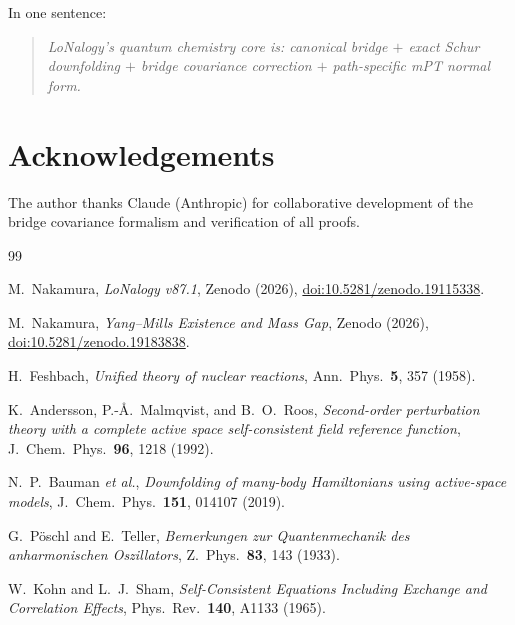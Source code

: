\documentclass[12pt]{article}
\theoremstyle{plain}
\theoremstyle{definition}
\numberwithin{equation}{section}
\begin{document}
In one sentence:
\begin{quote}
\emph{LoNalogy's quantum chemistry core is:
canonical bridge $+$ exact Schur downfolding $+$
bridge covariance correction $+$ path-specific mPT normal form.}
\end{quote}


\section*{Acknowledgements}

The author thanks Claude (Anthropic) for collaborative development
of the bridge covariance formalism and verification of all proofs.


\begin{thebibliography}{99}

M.~Nakamura,
\textit{LoNalogy v87.1},
Zenodo (2026),
\href{https://doi.org/10.5281/zenodo.19115338}{doi:10.5281/zenodo.19115338}.

M.~Nakamura,
\textit{Yang--Mills Existence and Mass Gap},
Zenodo (2026),
\href{https://doi.org/10.5281/zenodo.19183838}{doi:10.5281/zenodo.19183838}.

H.~Feshbach,
\textit{Unified theory of nuclear reactions},
Ann.\ Phys.\ \textbf{5}, 357 (1958).

K.~Andersson, P.-\AA.~Malmqvist, and B.~O.~Roos,
\textit{Second-order perturbation theory with a complete active
space self-consistent field reference function},
J.\ Chem.\ Phys.\ \textbf{96}, 1218 (1992).

N.~P.~Bauman \textit{et al.},
\textit{Downfolding of many-body Hamiltonians using
active-space models},
J.\ Chem.\ Phys.\ \textbf{151}, 014107 (2019).

G.~P\"oschl and E.~Teller,
\textit{Bemerkungen zur Quantenmechanik des anharmonischen
Oszillators},
Z.\ Phys.\ \textbf{83}, 143 (1933).

W.~Kohn and L.~J.~Sham,
\textit{Self-Consistent Equations Including Exchange and
Correlation Effects},
Phys.\ Rev.\ \textbf{140}, A1133 (1965).

\end{thebibliography}
\end{document}
